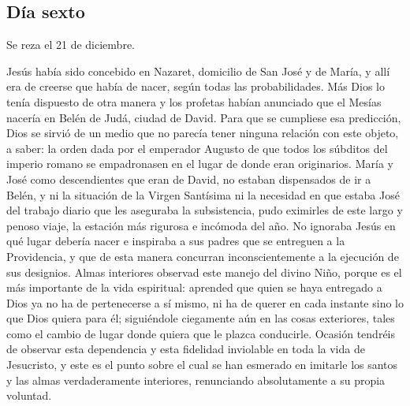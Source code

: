 \documentclass[spanish,utf8,twocolumn]{chlart}
\newenvironment{summary}{\begingroup
	\small\sffamily\itshape%
	\setlength{\leftskip}{3em}\setlength{\rightskip}{3em}\noindent
	}{\par\endgroup}
\newenvironment{lectura}{\begingroup\color{lector}}{\endgroup\par}
\begin{document}
\subsection*{Día sexto}
\begin{summary}
Se reza el 21 de diciembre.
\end{summary}
\begin{lectura}
Jesús había sido concebido en Nazaret, domicilio de San José y de María,
y allí era de creerse que había de nacer, según todas las probabilidades.
Más Dios lo tenía dispuesto de otra manera y los profetas habían
anunciado que el Mesías nacería en Belén de Judá, ciudad de David.
Para que se cumpliese esa predicción, Dios se sirvió de un medio que no
parecía tener ninguna relación con este objeto, a saber:
la orden dada por el emperador Augusto de que todos los súbditos del
imperio romano se empadronasen en el lugar de donde eran originarios.
María y José como descendientes que eran de David, no estaban
dispensados de ir a Belén, y ni la situación de la Virgen Santísima ni
la necesidad en que estaba José del trabajo diario que les aseguraba la
subsistencia, pudo eximirles de este largo y penoso viaje, la estación
más rigurosa e incómoda del año.
No ignoraba Jesús en qué lugar debería nacer e inspiraba a sus padres
que se entreguen a la Providencia, y que de esta manera concurran
inconscientemente a la ejecución de sus designios.
Almas interiores observad este manejo del divino Niño, porque es el más
importante de la vida espiritual:
aprended que quien se haya entregado a Dios ya no ha de pertenecerse a
sí mismo, ni ha de querer en cada instante sino lo que Dios quiera para
él; siguiéndole ciegamente aún en las cosas exteriores, tales como el
cambio de lugar donde quiera que le plazca conducirle.
Ocasión tendréis de observar esta dependencia y esta fidelidad
inviolable en toda la vida de Jesucristo, y este es el punto sobre el
cual se han esmerado en imitarle los santos y las almas verdaderamente
interiores, renunciando absolutamente a su propia voluntad.
\end{lectura}
\end{document}
